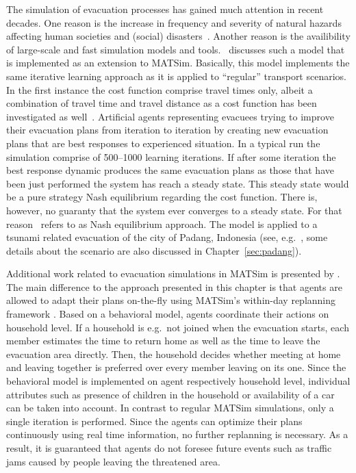 The simulation of evacuation processes has gained much attention in recent decades. One reason is the increase in frequency and severity of natural hazards affecting human societies and (social) disasters~\citep{Rodr2006HBoDisasterResearch}.
Another reason is the availibility of large-scale and fast simulation models and tools.~\citet{Laemmel_PhDThesis_2011} discusses such a model that is implemented as an extension to MATSim. Basically, this model implements the same iterative learning approach as it is applied to ``regular'' transport scenarios. In the first instance the cost function comprise travel times only, albeit a combination of travel time and travel distance as a cost function has been investigated as well~\citep{LaemmelKluepfelNagel2009EvacPadangAtBookTimmermanns}. 
Artificial agents representing evacuees trying to improve their evacuation plans from iteration to iteration by creating new evacuation plans that are best responses to experienced situation. 
In a typical run the simulation comprise of 500--1000 learning iterations. 
If after some iteration the best response dynamic produces the same evacuation plans as those that have been just performed the system has reach a steady state. This steady state would be a pure strategy Nash equilibrium regarding the cost function. There is, however, no guaranty that the system ever converges to a steady state. For that reason~\citet{Laemmel_PhDThesis_2011} refers to as Nash equilibrium approach.
The model is applied to a tsunami related evacuation of the city of Padang, Indonesia (see, e.g.\ \citep{TaubenboeckEtAl2012ConcludingLastMilePaperNatHazards,GosebergEtAl2012LastLastMile}, some details about the scenario are also discussed in Chapter~\ref{sec:padang}). 

Additional work related to evacuation simulations in MATSim is presented by \citet{Dobler_PhDThesis_2013}. The main difference to the approach presented in this chapter is that agents are allowed to adapt their plans on-the-fly using MATSim's within-day replanning framework \citep{DoblerEtAl_TRR_2012}. 
Based on a behavioral model, agents coordinate their actions on household level. If a household is e.g.\ not joined when the evacuation starts, each member estimates the time to return home as well as the time to leave the evacuation area directly. Then, the household decides whether meeting at home and leaving together is preferred over every member leaving on its one.
Since the behavioral model is implemented on agent respectively household level, individual attributes such as presence of children in the household or availability of a car can be taken into account.
In contrast to regular MATSim simulations, only a single iteration is performed. Since the agents can optimize their plans continuously using real time information, no further replanning is necessary. As a result, it is guaranteed that agents do not foresee future events such as traffic jams caused by people leaving the threatened area.

